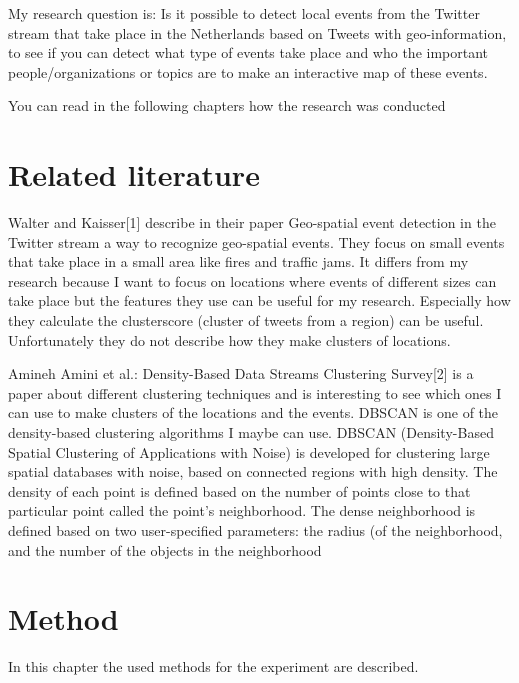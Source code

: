 \documentclass[
10pt, %
a4paper, %
oneside, %
headinclude,footinclude, %
BCOR5mm, %
]{scrartcl}
\begin{document}
My research question is: Is it possible to detect local events from the Twitter stream that take place in the Netherlands based on Tweets with geo-information, to see if you can detect what type of events take place and who the important people/organizations or topics are to make an interactive map of these events.

You can read in the following chapters how the research was conducted


\section{Related literature}
Walter and Kaisser[1] describe in their paper Geo-spatial event detection in the Twitter stream a way to recognize geo-spatial events. They focus on small events that take place in a small area like fires and traffic jams. It differs from my research because I want to focus on locations where events of different sizes can take place but the features they use can be useful for my research. Especially how they calculate the clusterscore (cluster of tweets from a region) can be useful. Unfortunately they do not describe how they make clusters of locations.

Amineh Amini et al.: Density-Based Data Streams Clustering Survey[2] is a paper about different clustering techniques and is interesting to see which ones I can use to make clusters of the locations and the events. DBSCAN is one of the density-based clustering algorithms I maybe can use.  DBSCAN (Density-Based Spatial Clustering of Applications with Noise) is developed for clustering large spatial databases with noise, based on connected regions with high density. The density of each point is defined based on the number of points close to that particular point called the point's neighborhood.
The dense neighborhood is defined based on two user-specified parameters: the radius (of the neighborhood, and the number of the objects in the neighborhood 





\newpage
\section{Method}
In this chapter the used methods for the experiment are described. 
\end{document}
